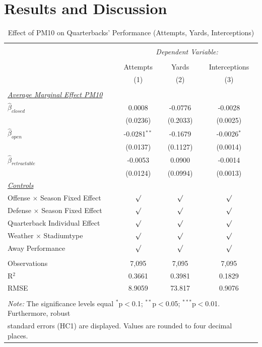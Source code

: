 \documentclass[12pt,a4paper]{article}
\begin{document}
{\section{Results and Discussion}
\begin{table}[!htbp] \centering 
  \caption{Effect of PM10 on Quarterbacks' Performance (Attempts, Yards, Interceptions)} 
  \label{T2} 
\begin{tabular}{@{\extracolsep{5pt}}lccc} 
\\[-1.8ex]\hline 
\hline \\[-1.8ex] 
 & \multicolumn{3}{c}{\textit{Dependent Variable:}} \\ \cline{2-4} \\ [-1.8ex]
 & Attempts & Yards & Interceptions \\ 
  & (1) & (2) & (3)\\ \hline \\[-1.8ex] 
 \underline{\textit{Average Marginal Effect PM10}}\\[0.4cm]
  $\hat{\beta}_{closed}$& 0.0008 & -0.0776 & -0.0028 \\ 
  & (0.0236)  & (0.2033)& (0.0025) \\[0.4cm]
  $\hat{\beta}_{open}$& -0.0281$^{**}$ & -0.1679 & -0.0026$^{*}$\\ 
  & (0.0137) & (0.1127) & (0.0014) \\[0.4cm]
  $\hat{\beta}_{retractable}$& -0.0053 & 0.0900 & -0.0014 \\ 
  & (0.0124) & (0.0994) & (0.0013)\\ [0.4cm]
  \underline{\textit{Controls}} \\[0.4cm]
  Offense $\times$ Season Fixed Effect & $\surd$ & $\surd$ & $\surd$ \\[0.4cm]
   Defense $\times$ Season Fixed Effect & $\surd$ & $\surd$  & $\surd$ \\[0.4cm]
    Quarterback Individual Effect & $\surd$ & $\surd$ & $\surd$  \\[0.4cm]
    Weather $\times $ Stadiumtype & $\surd$ & $\surd$ & $\surd$ \\[0.4cm]
    Away Performance & $\surd$ & $\surd$ & $\surd$\\
\hline \\[-1.8ex] 
Observations & 7,095 & 7,095 & 7,095 \\ 
R$^{2}$ & 0.3661 &  0.3981 & 0.1829\\ 
RMSE & 8.9059 & 73.817 & 0.9076\\ \hline 
\hline \\[-1.8ex] 
\multicolumn{4}{l}{\footnotesize \textit{Note:} The significance levels equal {$^{*}$p$<$0.1; $^{**}$p$<$0.05; $^{***}$p$<$0.01}.  Furthermore, robust} \\ \multicolumn{4}{l}{\footnotesize standard errors (HC1) are displayed. Values are rounded to four decimal places.}

\end{tabular}
\end{table}}
\end{document}
